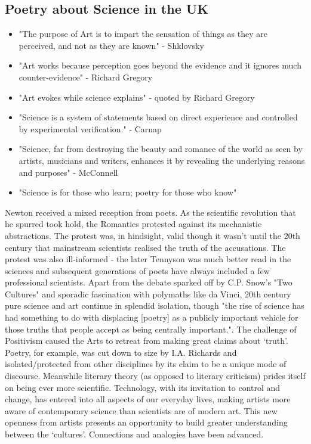 \documentclass[11pt]{article}
\begin{document}
\newpage\subsection{Poetry about Science in the UK }
\begin{itemize}
\item "The purpose of Art is to impart the sensation of things as they are perceived, and not as they are known" - Shklovsky
\item     "Art works because perception goes beyond the evidence and it ignores much counter-evidence" - Richard Gregory
\item     "Art evokes while science explains" - quoted by Richard Gregory
 \item    "Science is a system of statements based on direct experience and controlled by experimental verification." - Carnap
 \item    "Science, far from destroying the beauty and romance of the world as seen by artists, musicians and writers, enhances it by revealing the underlying reasons and purposes" - McConnell
\item     "Science is for those who learn; poetry for those who know"
\end{itemize}
Newton received a mixed reception from poets. As the scientific revolution that he spurred took hold, the Romantics protested against its mechanistic abstractions. The protest was, in hindsight, valid though it wasn't until the 20th century that mainstream scientists realised the truth of the accusations. The protest was also ill-informed - the later Tennyson was much better read in the sciences and subsequent generations of poets have always included a few professional scientists. Apart from the debate sparked off by C.P. Snow's "Two Cultures" and sporadic fascination with polymaths like da Vinci, 20th century pure science and art continue in splendid isolation, though "the rise of science has had something to do with displacing [poetry] as a publicly important vehicle for those truths that people accept as being centrally important.". The challenge of Positivism caused the Arts to retreat from making great claims about `truth'. Poetry, for example, was cut down to size by I.A. Richards and isolated/protected from other disciplines by its claim to be a unique mode of discourse. Meanwhile literary theory (as opposed to literary criticism) prides itself on being ever more scientific. Technology, with its invitation to control and change, has entered into all aspects of our everyday lives, making artists more aware of contemporary science than scientists are of modern art. This new openness from artists presents an opportunity to build greater understanding between the `cultures'. Connections and analogies have been advanced.
\end{document}
